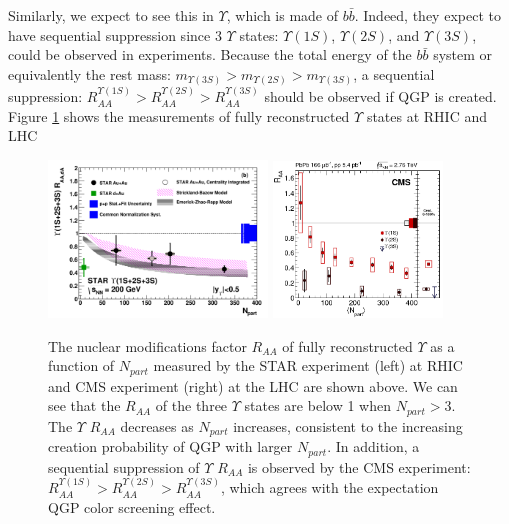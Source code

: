 Similarly, we expect to see this in $\Upsilon$, which is made of $b \bar b$. Indeed, they expect to have sequential suppression since 3 $\Upsilon$ states: $\Upsilon(1S)$,  $\Upsilon(2S)$, and $\Upsilon(3S)$, could be observed in experiments. Because the total energy of the $b \bar b$ system or equivalently the rest mass: $m_{\Upsilon(3S)} > m_{\Upsilon(2S)} > m_{\Upsilon(3S)}$, a sequential suppression: $R_{AA}^{\Upsilon(1S)} > R_{AA}^{\Upsilon(2S)} > R_{AA}^{\Upsilon(3S)}$ should be observed if QGP is created. Figure \ref{UpsilonSupp} shows the measurements of fully reconstructed $\Upsilon$ states at RHIC and LHC \cite{STARUpsilonRef,CMSUpsilonRef}

\begin{figure}[hbtp]
\begin{center}
\includegraphics[width=0.52\textwidth]{Figures/Chapter1/STARUpsilon.png}
\includegraphics[width=0.40\textwidth]{Figures/Chapter1/CMSUpsilon.png}
\caption{The nuclear modifications factor $R_{AA}$ of fully reconstructed $\Upsilon$ as a function of $N_{part}$ measured by the STAR experiment (left) at RHIC and CMS experiment (right) at the LHC are shown above. We can see that the $R_{AA}$ of the three $\Upsilon$ states are below 1 when $N_{part} > 3$. The $\Upsilon$ $R_{AA}$ decreases as $N_{part}$ increases, consistent to the increasing creation probability of QGP with larger $N_{part}$. In addition, a sequential suppression of $\Upsilon$ $R_{AA}$ is observed by the CMS experiment: $R_{AA}^{\Upsilon(1S)} > R_{AA}^{\Upsilon(2S)} > R_{AA}^{\Upsilon(3S)}$, which agrees with the expectation QGP color screening effect.}
\label{UpsilonSupp}
\end{center}
\end{figure} 


